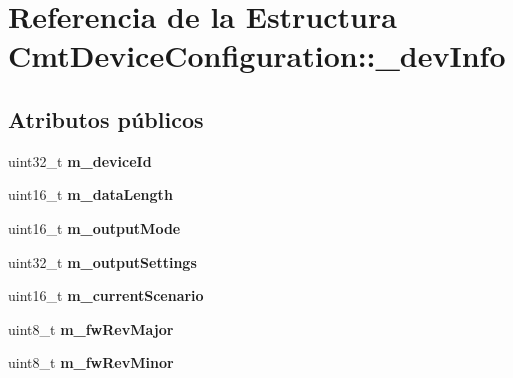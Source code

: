 \hypertarget{structCmtDeviceConfiguration_1_1__devInfo}{\section{\-Referencia de la \-Estructura \-Cmt\-Device\-Configuration\-:\-:\-\_\-dev\-Info}
\label{structCmtDeviceConfiguration_1_1__devInfo}
}
\subsection*{\-Atributos públicos}
\begin{DoxyCompactItemize}
\item 
\hypertarget{structCmtDeviceConfiguration_1_1__devInfo_ad1d7825a6618e39fd6125e0ed79476bc}{uint32\-\_\-t {\bfseries m\-\_\-device\-Id}}\label{structCmtDeviceConfiguration_1_1__devInfo_ad1d7825a6618e39fd6125e0ed79476bc}

\item 
\hypertarget{structCmtDeviceConfiguration_1_1__devInfo_ac3d35828709f33e82d38f08031060942}{uint16\-\_\-t {\bfseries m\-\_\-data\-Length}}\label{structCmtDeviceConfiguration_1_1__devInfo_ac3d35828709f33e82d38f08031060942}

\item 
\hypertarget{structCmtDeviceConfiguration_1_1__devInfo_a18c836c47320c815c6e63886a01c0107}{uint16\-\_\-t {\bfseries m\-\_\-output\-Mode}}\label{structCmtDeviceConfiguration_1_1__devInfo_a18c836c47320c815c6e63886a01c0107}

\item 
\hypertarget{structCmtDeviceConfiguration_1_1__devInfo_a3c29f7c45d02aee2b4fe377b2d0c3c4d}{uint32\-\_\-t {\bfseries m\-\_\-output\-Settings}}\label{structCmtDeviceConfiguration_1_1__devInfo_a3c29f7c45d02aee2b4fe377b2d0c3c4d}

\item 
\hypertarget{structCmtDeviceConfiguration_1_1__devInfo_a11300bb84eb9d8c3bd8373406c1de959}{uint16\-\_\-t {\bfseries m\-\_\-current\-Scenario}}\label{structCmtDeviceConfiguration_1_1__devInfo_a11300bb84eb9d8c3bd8373406c1de959}

\item 
\hypertarget{structCmtDeviceConfiguration_1_1__devInfo_a7eccb31201c49327cf79c3f360c31a19}{uint8\-\_\-t {\bfseries m\-\_\-fw\-Rev\-Major}}\label{structCmtDeviceConfiguration_1_1__devInfo_a7eccb31201c49327cf79c3f360c31a19}

\item 
\hypertarget{structCmtDeviceConfiguration_1_1__devInfo_a15fe0131e23c97def644dab5cecd83cb}{uint8\-\_\-t {\bfseries m\-\_\-fw\-Rev\-Minor}}\label{structCmtDeviceConfiguration_1_1__devInfo_a15fe0131e23c97def644dab5cecd83cb}


\end{DoxyCompactItemize}
